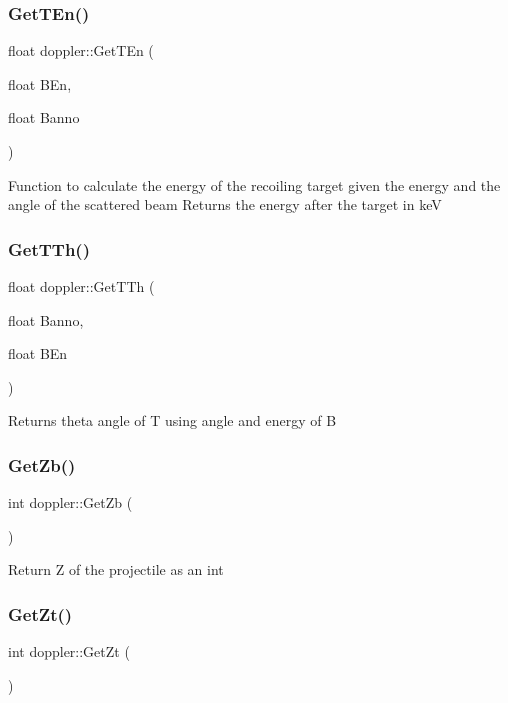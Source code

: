 \subsubsection{\texorpdfstring{Get\+T\+En()}{GetTEn()}}
{\footnotesize\ttfamily float doppler\+::\+Get\+T\+En (\begin{DoxyParamCaption}\item[{float}]{B\+En,  }\item[{float}]{Banno }\end{DoxyParamCaption})}

Function to calculate the energy of the recoiling target given the energy and the angle of the scattered beam Returns the energy after the target in keV \mbox{\label{classdoppler_a7865dcf92a6b18d23cb48e9e624e505b}} 
\subsubsection{\texorpdfstring{Get\+T\+Th()}{GetTTh()}}
{\footnotesize\ttfamily float doppler\+::\+Get\+T\+Th (\begin{DoxyParamCaption}\item[{float}]{Banno,  }\item[{float}]{B\+En }\end{DoxyParamCaption})}

Returns theta angle of T using angle and energy of B \mbox{\label{classdoppler_a29e9a1565d90df9f5d9deef05cdbf53c}} 
\subsubsection{\texorpdfstring{Get\+Zb()}{GetZb()}}
{\footnotesize\ttfamily int doppler\+::\+Get\+Zb (\begin{DoxyParamCaption}{ }\end{DoxyParamCaption})}

Return Z of the projectile as an int \mbox{\label{classdoppler_ac0587ca2b963edec86d17dd6dac024ce}} 
\subsubsection{\texorpdfstring{Get\+Zt()}{GetZt()}}
{\footnotesize\ttfamily int doppler\+::\+Get\+Zt (\begin{DoxyParamCaption}{ }\end{DoxyParamCaption})}

